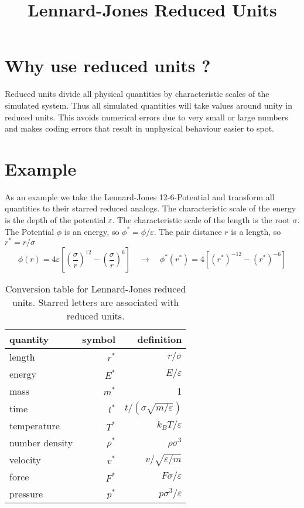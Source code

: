 \documentclass[a4paper,11pt]{scrartcl}
\begin{document}
\title{Lennard-Jones Reduced Units}
\date{}
\maketitle

\section*{Why use reduced units ?}
Reduced units divide all physical quantities by characteristic scales of the simulated system. Thus all simulated quantities will take values around unity in reduced units. This avoids numerical errors due to very small or large numbers and makes coding errors that result in unphysical behaviour easier to spot.

\section*{Example}
As an example we take the Lennard-Jones 12-6-Potential and transform all quantities to their starred reduced analogs. The characteristic scale of the energy is the depth of the potential $\varepsilon$. The characteristic scale of the length is the root $\sigma$. The Potential $\phi$ is an energy, so $\phi^* = \phi / \varepsilon $. The pair distance $r$ is a length, so $r^* = r / \sigma $
\begin{displaymath}
\phi (r) = 4 \varepsilon \left[ \left( \frac{\sigma}{r} \right)^{12} - \left( \frac{\sigma}{r} \right)^6 \right] \quad \rightarrow \quad \phi^* (r^*) = 4 \left[ (r^*)^{-12} - (r^*)^{-6} \right]
\end{displaymath}

\begin{table}[h!]
\centering
\begin{tabular}{lrr}
quantity & symbol & definition \\
\hline
length & $r^*$ & $r / \sigma$  \\
energy & $E^*$ & $E / \varepsilon$ \\
mass & $m^*$ & 1\\
time & $t^*$ & $t / \left( \sigma \sqrt{m / \varepsilon} \right)$ \\
temperature & $T^*$ & $k_B T / \varepsilon$ \\
number density & $\rho^*$ & $\rho \sigma^3$ \\
velocity & $v^*$ & $v / \sqrt{\varepsilon / m}$  \\
force & $F^*$ & $F \sigma / \varepsilon$ \\
pressure & $p^*$ & $p \sigma^3 / \varepsilon$ \\
\end{tabular}
\caption{Conversion table for Lennard-Jones reduced units. Starred letters are associated with reduced units.}
\end{table}
\end{document}
